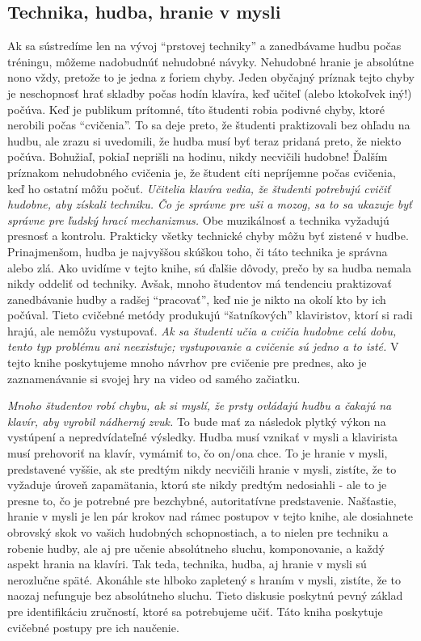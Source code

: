 \subsection{Technika, hudba, hranie v mysli}
Ak sa sústredíme len na vývoj “prstovej techniky” a zanedbávame hudbu počas tréningu, môžeme nadobudnúť nehudobné návyky. Nehudobné hranie je absolútne nono vždy, pretože to je jedna z foriem chyby. Jeden obyčajný príznak tejto chyby je neschopnosť hrať skladby počas hodín klavíra, keď učiteľ (alebo ktokoľvek iný!) počúva. Keď je publikum prítomné, títo študenti robia podivné chyby, ktoré nerobili počas “cvičenia”. To sa deje preto, že študenti praktizovali bez ohľadu na hudbu, ale zrazu si uvedomili, že hudba musí byť teraz pridaná preto, že niekto počúva. Bohužiaľ, pokiaľ neprišli na hodinu, nikdy necvičili hudobne! Ďalším príznakom nehudobného cvičenia je, že študent cíti nepríjemne počas cvičenia, keď ho ostatní môžu počuť. \emph{Učitelia klavíra vedia, že študenti potrebujú cvičiť hudobne, aby získali techniku. Čo je správne pre uši a mozog, sa to sa ukazuje byť správne pre ľudský hrací mechanizmus.} Obe muzikálnosť a technika vyžadujú presnosť a kontrolu. Prakticky všetky technické chyby môžu byť zistené v hudbe. Prinajmenšom, hudba je najvyššou skúškou toho, či táto technika je správna alebo zlá. Ako uvidíme v tejto knihe, sú ďalšie dôvody, prečo by sa hudba nemala nikdy oddeliť od techniky. Avšak, mnoho študentov má tendenciu praktizovať zanedbávanie hudby a radšej “pracovať”, keď nie je nikto na okolí kto by ich počúval. Tieto cvičebné metódy produkujú “šatníkových” klaviristov, ktorí si radi hrajú, ale nemôžu vystupovať. \emph{Ak sa študenti učia a cvičia hudobne celú dobu, tento typ problému ani neexistuje; vystupovanie a cvičenie sú jedno a to isté.} V tejto knihe poskytujeme mnoho návrhov pre cvičenie pre prednes, ako je zaznamenávanie si svojej hry na video od samého začiatku.

\emph{Mnoho študentov robí chybu, ak si myslí, že prsty ovládajú hudbu a čakajú na klavír, aby vyrobil nádherný zvuk.} To bude mať za následok plytký výkon na vystúpení a nepredvídateľné výsledky. Hudba musí vznikať v mysli a klavirista musí prehovoriť na klavír, vymámiť to, čo on/ona chce. To je hranie v mysli, predstavené vyššie, ak ste predtým nikdy necvičili hranie v mysli, zistíte, že to vyžaduje úroveň zapamätania, ktorú ste nikdy predtým nedosiahli - ale to je presne to, čo je potrebné pre bezchybné, autoritatívne predstavenie. Našťastie, hranie v mysli je len pár krokov nad rámec postupov v tejto knihe, ale dosiahnete obrovský skok vo vašich hudobných schopnostiach, a to nielen pre techniku a robenie hudby, ale aj pre učenie absolútneho sluchu, komponovanie, a každý aspekt hrania na klavíri. Tak teda, technika, hudba, aj hranie v mysli sú nerozlučne späté. Akonáhle ste hlboko zapletený s hraním v mysli, zistíte, že to naozaj nefunguje bez absolútneho sluchu. Tieto diskusie poskytnú pevný základ pre identifikáciu zručností, ktoré sa potrebujeme učiť. Táto kniha poskytuje cvičebné postupy pre ich naučenie.

